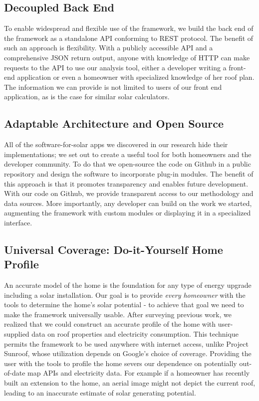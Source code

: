 \documentclass[pageno]{jpaper}
\begin{document}
\subsection{Decoupled Back End}
To enable widespread and flexible use of the framework, we build the back end of the framework as a standalone API conforming to REST protocol. The benefit of such an approach is flexibility. With a publicly accessible API and a comprehensive JSON return output, anyone with knowledge of HTTP can make requests to the API to use our analysis tool, either a developer writing a front-end application or even a homeowner with specialized knowledge of her roof plan. The information we can provide is not limited to users of our front end application, as is the case for similar solar calculators.

\subsection{Adaptable Architecture and Open Source}
All of the software-for-solar apps we discovered in our research hide their implementations; we set out to create a useful tool for both homeowners and the developer community. To do that we open-source the code on Github in a public repository and design the software to incorporate plug-in modules. The benefit of this approach is that it promotes transparency and enables future development. With our code on Github, we provide transparent access to our methodology and data sources. More importantly, any developer can build on the work we started, augmenting the framework with custom modules or displaying it in a specialized interface.

\subsection{Universal Coverage: Do-it-Yourself Home Profile}
An accurate model of the home is the foundation for any type of energy upgrade including a solar installation. Our goal is to provide {\em every homeowner} with the tools to determine the home's solar potential - to achieve that goal we need to make the framework universally usable. After surveying previous work, we realized that we could construct an accurate profile of the home with user-supplied data on roof properties and electricity consumption. This technique permits the framework to be used anywhere with internet access, unlike Project Sunroof, whose utilization depends on Google's choice of coverage. Providing the user with the tools to profile the home severs our dependence on potentially out-of-date map APIs and electricity data. For example if a homeowner has recently built an extension to the home, an aerial image might not depict the current roof, leading to an inaccurate estimate of solar generating potential.
\end{document}
